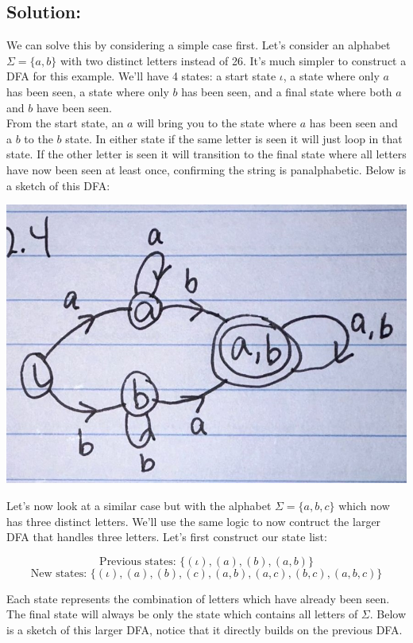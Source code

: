 \documentclass[12pt]{article}
\begin{document}
\subsection*{\textbf{Solution:}}
We can solve this by considering a simple case first. Let's consider an alphabet $\Sigma = \{ a, b \}$ with two distinct letters instead of 26. It's much simpler to construct a DFA for this example. We'll have 4 states: a start state $\iota$, a state where only $a$ has been seen, a state where only $b$ has been seen, and a final state where both $a$ and $b$ have been seen. \\

From the start state, an $a$ will bring you to the state where $a$ has been seen and a $b$ to the $b$ state. In either state if the same letter is seen it will just loop in that state. If the other letter is seen it will transition to the final state where all letters have now been seen at least once, confirming the string is panalphabetic. Below is a sketch of this DFA:

\begin{center}
\includegraphics[scale=.2]{14.2.4.1}
\end{center}

Let's now look at a similar case but with the alphabet $\Sigma = \{ a, b, c \}$ which now has three distinct letters. We'll use the same logic to now contruct the larger DFA that handles three letters. Let's first construct our state list:

\[ \text{Previous states: } \{ (\iota), (a), (b), (a,b) \} \]
\[ \text{New states: } \{ (\iota), (a), (b), (c), (a,b), (a,c), (b,c), (a,b,c) \} \]

Each state represents the combination of letters which have already been seen. The final state will always be only the state which contains all letters of $\Sigma$. Below is a sketch of this larger DFA, notice that it directly builds on the previous DFA.
\end{document}
